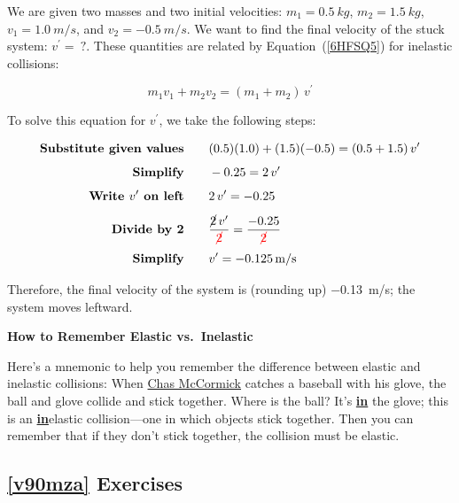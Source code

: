 \documentclass{article}
\numberwithin{equation}{section}
\numberwithin{figure}{section}
\begin{document}
\Solution We are given two masses and two initial velocities: $m_1 = \SI{0.5}{kg}$, $m_2 = \SI{1.5}{kg}$, $v_1 = \SI{+1.0}{m/s}$, and $v_2 = \SI{-0.5}{m/s}$.  We want to find the final velocity of the stuck system: $v^{\prime} =\ ?$. These quantities are related by Equation~(\ref{6HFSQ5}) for inelastic collisions:
\vspace{-1ex}

\begin{equation*}
    m_1 v_1 + m_2 v_2 = (m_1 + m_2)\,v^{\prime}
\end{equation*}

To solve this equation for $v^{\prime}$, we take the following steps:
\vspace{-1ex}

\begin{align*}
    \textbf{Substitute given values} \qquad & (0.5)(1.0) + (1.5)(-0.5) = (0.5 + 1.5)\,v^{\prime}\\[1ex]
    \textbf{Simplify} \qquad & -0.25 = 2\,v^{\prime}\\[1ex]
    \textbf{Write $v^{\prime}$ on left} \qquad & 2\,v^{\prime} = -0.25\\[1ex]
    \textbf{Divide by 2} \qquad & \frac{\cancel{2}\,v^{\prime}}{\textcolor{red}{\cancel{2}}} = \frac{-0.25}{\textcolor{red}{\cancel{2}}}\\[1ex]
    \textbf{Simplify} \qquad & v^{\prime} = -\SI{0.125}{m/s}
\end{align*}

Therefore, the final velocity of the system is (rounding up) \SI{-0.13}{m/s}; the system moves leftward.

\cyanhrule

\begin{mdframed}[backgroundcolor=black!10]
\textbf{How to Remember Elastic vs.~Inelastic}
\vspace{1ex}

Here's a mnemonic to help you remember the difference between elastic and inelastic collisions: When \href{https://youtu.be/UOyDnrAZmhA?t=14}{Chas McCormick} catches a baseball with his glove, the ball and glove collide and stick together. Where is the ball? It's \underline{\textbf{in}} the glove; this is an \underline{\textbf{in}}elastic collision---one in which objects stick together. Then you can remember that if they don't stick together, the collision must be elastic.
\end{mdframed}

\subsection*{\ref{v90mza} Exercises}
\end{document}

